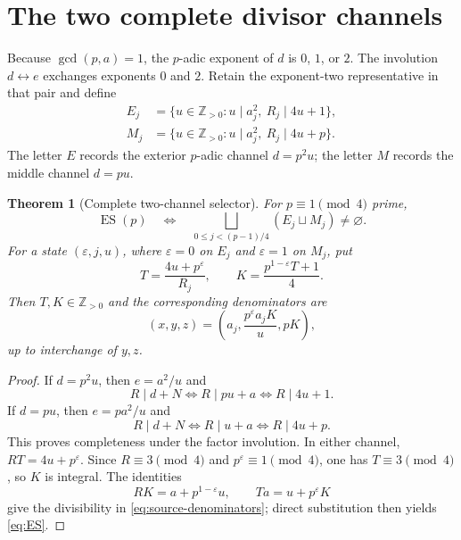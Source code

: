\documentclass[11pt]{article}
\newtheorem{theorem}{Theorem}[section]
\theoremstyle{definition}
\theoremstyle{remark}
\newcommand{\Z}{\mathbb Z}
\newcommand{\ES}{\operatorname{ES}}
\begin{document}
\section{The two complete divisor channels}

Because $\gcd(p,a)=1$, the $p$-adic exponent of $d$ is $0$, $1$, or $2$.
The involution $d\leftrightarrow e$ exchanges exponents $0$ and $2$.  Retain
the exponent-two representative in that pair and define
\begin{align}
 E_j&=\{u\in\Z_{>0}:u\mid a_j^2,\ R_j\mid4u+1\},\label{eq:E}\\
 M_j&=\{u\in\Z_{>0}:u\mid a_j^2,\ R_j\mid4u+p\}.\label{eq:M}
\end{align}
The letter $E$ records the exterior $p$-adic channel $d=p^2u$; the letter
$M$ records the middle channel $d=pu$.

\begin{theorem}[Complete two-channel selector]\label{thm:selector}
For $p\equiv1\pmod4$ prime,
\begin{equation}\label{eq:ES-selector}
 \ES(p)
 \quad\Longleftrightarrow\quad
 \bigsqcup_{0\le j<(p-1)/4}(E_j\sqcup M_j)\ne\varnothing.
\end{equation}
For a state $(\varepsilon,j,u)$, where $\varepsilon=0$ on $E_j$ and
$\varepsilon=1$ on $M_j$, put
\begin{equation}\label{eq:T-K}
 T=\frac{4u+p^\varepsilon}{R_j},
 \qquad
 K=\frac{p^{1-\varepsilon}T+1}{4}.
\end{equation}
Then $T,K\in\Z_{>0}$ and the corresponding denominators are
\begin{equation}\label{eq:source-denominators}
 (x,y,z)=
 \left(a_j,\frac{p^\varepsilon a_jK}{u},pK\right),
\end{equation}
up to interchange of $y,z$.
\end{theorem}

\begin{proof}
If $d=p^2u$, then $e=a^2/u$ and
\[
 R\mid d+N
 \Longleftrightarrow R\mid pu+a
 \Longleftrightarrow R\mid4u+1.
\]
If $d=pu$, then $e=pa^2/u$ and
\[
 R\mid d+N
 \Longleftrightarrow R\mid u+a
 \Longleftrightarrow R\mid4u+p.
\]
This proves completeness under the factor involution.  In either channel,
$RT=4u+p^\varepsilon$.  Since $R\equiv3\pmod4$ and
$p^\varepsilon\equiv1\pmod4$, one has $T\equiv3\pmod4$, so $K$ is integral.
The identities
\[
 RK=a+p^{1-\varepsilon}u,
 \qquad Ta=u+p^\varepsilon K
\]
give the divisibility in \eqref{eq:source-denominators}; direct substitution
then yields \eqref{eq:ES}.
\end{proof}
\end{document}
